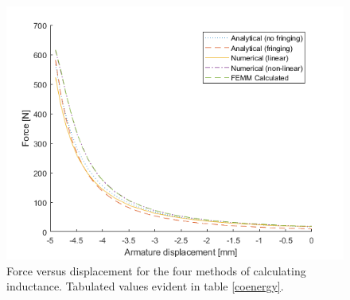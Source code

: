 \documentclass[a4paper]{IEEEtran}
\begin{document}
    \begin{figure}[ht]
        \includegraphics[width = \linewidth]{F-x.png}
        \caption{Force versus displacement for the four methods of calculating inductance. Tabulated values evident in table \ref{coenergy}.}
        \label{forceGraph} 
    \end{figure}
\end{document}

